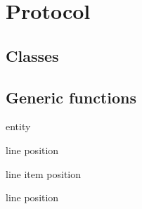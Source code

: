 \appendix

\section{Protocol}

\subsection{Classes}




\subsection{Generic functions}

 {entity}

 {line position}

 {line item position}

 {line position}
